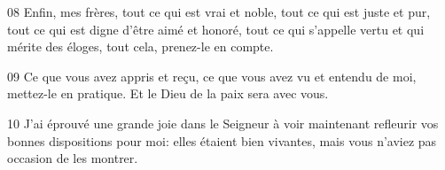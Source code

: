 
08 Enfin, mes frères, tout ce qui est vrai et noble, tout ce qui est juste et pur, tout ce qui est digne d’être aimé et honoré, tout ce qui s’appelle vertu et qui mérite des éloges, tout cela, prenez-le en compte.

09 Ce que vous avez appris et reçu, ce que vous avez vu et entendu de moi, mettez-le en pratique. Et le Dieu de la paix sera avec vous.

10 J’ai éprouvé une grande joie dans le Seigneur à voir maintenant refleurir vos bonnes dispositions pour moi: elles étaient bien vivantes, mais vous n’aviez pas occasion de les montrer.